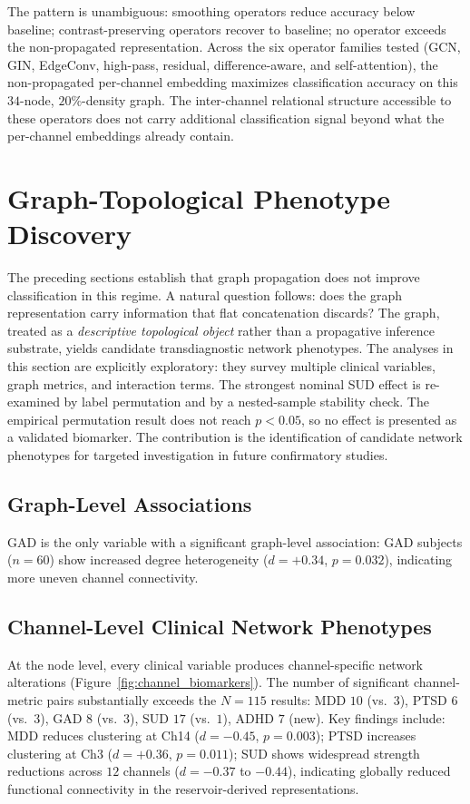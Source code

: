 The pattern is unambiguous: smoothing operators reduce accuracy below baseline; contrast-preserving operators recover to baseline; no operator exceeds the non-propagated representation. Across the six operator families tested (GCN, GIN, EdgeConv, high-pass, residual, difference-aware, and self-attention), the non-propagated per-channel embedding maximizes classification accuracy on this $34$-node, $20\%$-density graph. The inter-channel relational structure accessible to these operators does not carry additional classification signal beyond what the per-channel embeddings already contain.


\section{Graph-Topological Phenotype Discovery}
\label{sec:ch5_interpretability}

The preceding sections establish that graph propagation does not improve classification in this regime. A natural question follows: does the graph representation carry information that flat concatenation discards? The graph, treated as a \emph{descriptive topological object} rather than a propagative inference substrate, yields candidate transdiagnostic network phenotypes. The analyses in this section are explicitly exploratory: they survey multiple clinical variables, graph metrics, and interaction terms. The strongest nominal SUD effect is re-examined by label permutation and by a nested-sample stability check. The empirical permutation result does not reach $p < 0.05$, so no effect is presented as a validated biomarker. The contribution is the identification of candidate network phenotypes for targeted investigation in future confirmatory studies.

\subsection{Graph-Level Associations}

GAD is the only variable with a significant graph-level association: GAD subjects ($n = 60$) show increased degree heterogeneity ($d = +0.34$, $p = 0.032$), indicating more uneven channel connectivity.

\subsection{Channel-Level Clinical Network Phenotypes}

At the node level, every clinical variable produces channel-specific network alterations (Figure~\ref{fig:channel_biomarkers}). The number of significant channel-metric pairs substantially exceeds the $N = 115$ results: MDD $10$ (vs.\ $3$), PTSD $6$ (vs.\ $3$), GAD $8$ (vs.\ $3$), SUD $17$ (vs.\ $1$), ADHD $7$ (new). Key findings include: MDD reduces clustering at Ch14 ($d = -0.45$, $p = 0.003$); PTSD increases clustering at Ch3 ($d = +0.36$, $p = 0.011$); SUD shows widespread strength reductions across $12$ channels ($d = -0.37$ to $-0.44$), indicating globally reduced functional connectivity in the reservoir-derived representations.


